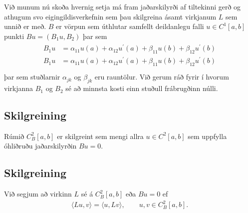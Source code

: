 \documentclass[a4paper,10pt,icelandic]{sphinxmanual}
\begin{document}
Við munum nú skoða hvernig setja má fram jaðarskilyrði af tiltekinni gerð og athugum svo eigingildisverkefnin sem þau skilgreina ásamt virkjanum \(L\) sem unnið er með.  \(B\) er vörpun sem úthlutar samfellt deildanlegu falli \(u\in C^1[a,b]\) punkti \(Bu = (B_1 u , B_2)\) þar sem
\begin{equation*}
\begin{split}\begin{align*}
B_1 u&=\alpha_{11}u(a)+\alpha_{12}u{{^{\prime}}}(a)
+\beta_{11}u(b)+\beta_{12}u{{^{\prime}}}(b) \\
B_1 u&=\alpha_{11}u(a)+\alpha_{12}u{{^{\prime}}}(a)
+\beta_{11}u(b)+\beta_{12}u{{^{\prime}}}(b) \\
\end{align*}\end{split}
\end{equation*}
þar sem stuðlarnir \(\alpha_{jk}\) og \(\beta_{jk}\) eru
rauntölur. Við gerum ráð fyrir í hvorum virkjanna \(B_1\) og \(B_2\) sé að minnsta kosti einn stuðull frábrugðinn núlli.


\subsection{Skilgreining}
\label{\detokenize{Kafli03:id3}}
Rúmið \(C^2_B[a,b]\) er skilgreint sem mengi allra
\(u\in C^2[a,b]\) sem uppfylla óhliðruðu jaðarskilyrðin
\(Bu=0\).


\subsection{Skilgreining}
\label{\detokenize{Kafli03:id4}}
Við segjum að virkinn \(L\) sé  á \(C^2_B[a,b]\) eða
 \(Bu=0\) ef
\begin{equation*}
\begin{split}{{\langle Lu,v\rangle}} ={{\langle u,Lv\rangle}}, \qquad u,v\in C^2_B[a,b].\end{split}
\end{equation*}
\end{document}
